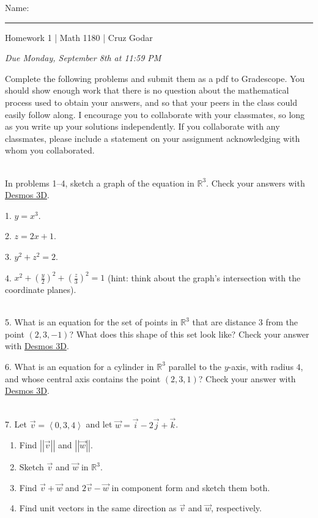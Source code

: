 \documentclass{article}
\begin{document}
\Large Name: \rule{2in}{0.15mm} \hfill Homework 1 | Math 1180 | Cruz Godar \vspace{4pt} \normalsize

\textit{Due Monday, September 8th at 11:59 PM}

Complete the following problems and submit them as a pdf to Gradescope. You should show enough work that there is no question about the mathematical process used to obtain your answers, and so that your peers in the class could easily follow along. I encourage you to collaborate with your classmates, so long as you write up your solutions independently. If you collaborate with any classmates, please include a statement on your assignment acknowledging with whom you collaborated.

~\\

In problems 1--4, sketch a graph of the equation in $\mathbb{R}^3$. Check your answers with \href{https://www.desmos.com/3d}{Desmos 3D}.

1. $\displaystyle y = x^3$.

2. $\displaystyle z = 2x + 1$.

3. $\displaystyle y^2 + z^2 = 2$.

4. $\displaystyle x^2 + \left( \frac{y}{2} \right)^2 + \left( \frac{z}{3} \right)^2 = 1$ (hint: think about the graph's intersection with the coordinate planes).

~\\

5. What is an equation for the set of points in $\mathbb{R}^3$ that are distance $3$ from the point $(2, 3, -1)$? What does this shape of this set look like? Check your answer with \href{https://www.desmos.com/3d}{Desmos 3D}.

6. What is an equation for a cylinder in $\mathbb{R}^3$ parallel to the $y$-axis, with radius $4$, and whose central axis contains the point $(2, 3, 1)$? Check your answer with \href{https://www.desmos.com/3d}{Desmos 3D}.

~\\

7. Let $\vec{v} = \left< 0, 3, 4 \right>$ and let $\vec{w} = \vec{i} - 2\vec{j} + \vec{k}$.

\begin{enumerate}

	\item Find $\left| \left| \vec{v} \right| \right|$ and $\left| \left| \vec{w} \right| \right|$.

	\item Sketch $\vec{v}$ and $\vec{w}$ in $\mathbb{R}^3$.

	\item Find $\vec{v} + \vec{w}$ and $2\vec{v} - \vec{w}$ in component form and sketch them both.

	\item Find unit vectors in the same direction as $\vec{v}$ and $\vec{w}$, respectively.

\end{enumerate}
\end{document}
